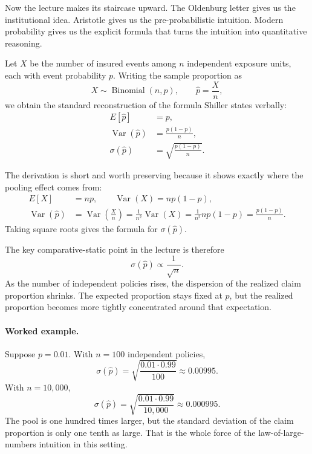 Now the lecture makes its staircase upward. The Oldenburg letter gives us the institutional idea. Aristotle gives us the pre-probabilistic intuition. Modern probability gives us the explicit formula that turns the intuition into quantitative reasoning.

Let \(X\) be the number of insured events among \(n\) independent exposure units, each with event probability \(p\). Writing the sample proportion as
\begin{equation}
X \sim \operatorname{Binomial}(n,p), \qquad \hat p = \frac{X}{n},
\end{equation}
we obtain the standard reconstruction of the formula Shiller states verbally:
\begin{align}
E[\hat p] &= p,\\
\operatorname{Var}(\hat p) &= \frac{p(1-p)}{n},\\
\sigma(\hat p) &= \sqrt{\frac{p(1-p)}{n}}.
\end{align}

The derivation is short and worth preserving because it shows exactly where the pooling effect comes from:
\begin{align}
E[X] &= np, \qquad \operatorname{Var}(X)=np(1-p),\\
\operatorname{Var}(\hat p)
&= \operatorname{Var}\!\left(\frac{X}{n}\right)
 = \frac{1}{n^2}\operatorname{Var}(X)
 = \frac{1}{n^2}np(1-p)
 = \frac{p(1-p)}{n}.
\end{align}
Taking square roots gives the formula for \(\sigma(\hat p)\).

The key comparative-static point in the lecture is therefore
\begin{equation}
\sigma(\hat p)\propto \frac{1}{\sqrt{n}}.
\end{equation}
As the number of independent policies rises, the dispersion of the realized claim proportion shrinks. The expected proportion stays fixed at \(p\), but the realized proportion becomes more tightly concentrated around that expectation.

\paragraph{Worked example.} Suppose \(p=0.01\). With \(n=100\) independent policies,
\begin{equation}
\sigma(\hat p)=\sqrt{\frac{0.01\cdot 0.99}{100}} \approx 0.00995.
\end{equation}
With \(n=10{,}000\),
\begin{equation}
\sigma(\hat p)=\sqrt{\frac{0.01\cdot 0.99}{10{,}000}} \approx 0.000995.
\end{equation}
The pool is one hundred times larger, but the standard deviation of the claim proportion is only one tenth as large. That is the whole force of the law-of-large-numbers intuition in this setting.

